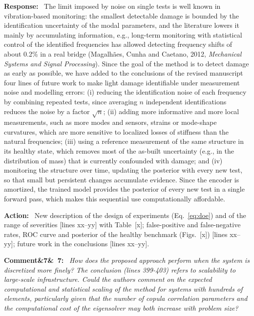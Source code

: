 \documentclass[11pt]{article}
\newenvironment{rcomment}[1]{\par\bigskip\noindent\textbf{Comment\ifx&#1&\else\ #1\fi:}\ \itshape}{\par}
\newenvironment{response}{\par\smallskip\noindent\color{resp}\textbf{Response:}\ }{\par}
\newenvironment{action}{\par\smallskip\noindent\color{resp}\textbf{Action:}\ }{\par}
\newcommand{\tbd}[1]{\textcolor{note}{\textsf{[#1]}}}
\newcommand{\lines}[1]{\tbd{lines #1}}
\begin{document}
\begin{response}
The limit imposed by noise on single tests is well known in vibration-based monitoring: the smallest detectable
damage is bounded by the identification uncertainty of the modal parameters, and the literature lowers it mainly by
accumulating information, e.g., long-term monitoring with statistical control of the identified frequencies has
allowed detecting frequency shifts of about 0.2\% in a real bridge (Magalh\~aes, Cunha and Caetano, 2012,
\emph{Mechanical Systems and Signal Processing}). Since the goal of the method is to detect damage as early as
possible, we have added to the conclusions of the revised manuscript four lines of future work to make light damage identifiable
under measurement noise and modelling errors: (i) reducing the identification noise of each frequency by combining repeated tests, since averaging $n$ independent identifications reduces the noise by a factor $\sqrt{n}$; (ii) adding more informative and more local measurements, such as more modes and sensors, strains or mode-shape curvatures, which are more sensitive to localized losses of stiffness than the natural frequencies; (iii) using a reference measurement of the same structure in its healthy state, which removes most of the as-built uncertainty (e.g., in the distribution of mass) that is currently confounded with damage; and (iv) monitoring the structure over time, updating the posterior with every new test, so that small but persistent changes accumulate evidence. Since the encoder is amortized, the trained model provides the posterior of every new test in a single forward pass, which makes this sequential use computationally affordable.
\end{response}

\begin{action}
New description of the design of experiments (Eq.~\eqref{eq:doe}) and of the range of severities \lines{xx--yy} with
Table~\tbd{x}; false-positive and false-negative rates, ROC curve and posterior of the healthy benchmark (Figs.~\tbd{x}) \lines{xx--yy}; future work in the conclusions \lines{xx--yy}.
\end{action}

\begin{rcomment}{7}
How does the proposed approach perform when the system is discretized more finely? The conclusion (lines 399-403)
refers to scalability to large-scale infrastructure. Could the authors comment on the expected computational and
statistical scaling of the method for systems with hundreds of elements, particularly given that the number of copula
correlation parameters and the computational cost of the eigensolver may both increase with problem size?
\end{rcomment}
\end{document}
